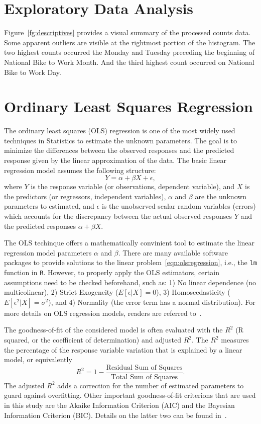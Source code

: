 \documentclass [11pt, proquest] {uwthesis}[2015/03/03]
\begin{document}
\section{Exploratory Data Analysis}
Figure~\ref{fg:descriptives} provides a visual summary of the processed counts data. Some apparent outliers are visible at the rightmost portion of the histogram. The two highest counts occurred the Monday and Tuesday preceding the beginning of National Bike to Work Month. And the third highest count occurred on National Bike to Work Day.

\section{Ordinary Least Squares Regression}
The ordinary least squares (OLS) regression is one of the most widely used techniques in Statistics to estimate the unknown parameters. The goal is to minimize the differences between the observed responses and the predicted response given by the linear approximation of the data. The basic linear regression model assumes the following structure:
\begin{equation}
Y = \alpha + \beta X + \epsilon, \label{eqn:olsregression}
\end{equation}
where $Y$ is the response variable (or observations, dependent variable), and $X$ is the predictors (or regressors, independent variables), $\alpha$ and $\beta$ are the unknown parameters to estimated, and $\epsilon$ is the unobserved scalar random variables (errors) which accounts for the discrepancy between the actual observed responses $Y$ and the predicted responses $\alpha + \beta X$.  

The OLS techinque offers a mathematically convinient tool to estimate the linear regression model parameters $\alpha$ and $\beta$. There are many available software packages to provide solutions to the linear problem~\eqref{eqn:olsregression}, i.e., the \texttt{lm} function in \texttt{R}. However, to properly apply the OLS estimators, certain assumptions need to be checked beforehand, such as: 1) No linear dependence (no multicolinear), 2) Strict Exogeneity ($E[\epsilon|X]=0$), 3) Homoscedasticity ($E[\epsilon^2|X]=\sigma^2$), and 4) Normality (the error term has a normal distribution). For more details on OLS regression models, readers are referred to~\cite{}.

The goodness-of-fit of the considered model is often evaluated with the $R^2$ (R squared, or the coefficient of determination) and adjusted $R^2$. The $R^2$ measures the percentage of the response variable variation that is explained by a linear model, or equivalently
\begin{equation}
R^2 = 1- \frac{\text{Residual Sum of Squares}}{\text{Total Sum of Squares}}.\label{eqn:R2}
\end{equation}
The adjusted $R^2$ adds a correction for the number of estimated parameters to guard against overfitting. Other important goodness-of-fit criterions that are used in this study are the Akaike Information Criterion (AIC) and the Bayesian Information Criterion (BIC). Details on the latter two can be found in~\cite{}.
\end{document}
